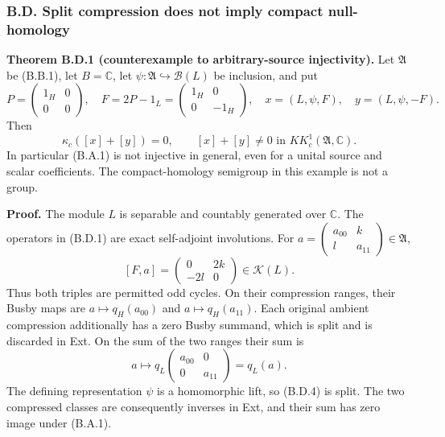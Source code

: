 \documentclass[
  11pt,
]{article}
\begin{document}
\subsubsection{B.D. Split compression does not imply compact
null-homology}\label{b.d.-split-compression-does-not-imply-compact-null-homology}

\textbf{Theorem B.D.1 (counterexample to arbitrary-source injectivity).}
Let \(\mathfrak A\) be (B.B.1), let \(B=\mathbb C\), let
\(\psi:\mathfrak A\hookrightarrow\mathcal B(L)\) be inclusion, and put
\[
P=\begin{pmatrix}1_H&0\\0&0\end{pmatrix},\quad
F=2P-1_L=\begin{pmatrix}1_H&0\\0&-1_H\end{pmatrix},\quad
x=(L,\psi,F),\quad y=(L,\psi,-F).
\tag{B.D.1}
\] Then \[
\kappa_c([x]+[y])=0,
\qquad [x]+[y]\ne0\text{ in }KK_c^1(\mathfrak A,\mathbb C).
\tag{B.D.2}
\] In particular (B.A.1) is not injective in general, even for a unital
source and scalar coefficients. The compact-homology semigroup in this
example is not a group.

\textbf{Proof.} The module \(L\) is separable and countably generated
over \(\mathbb C\). The operators in (B.D.1) are exact self-adjoint
involutions. For
\(a=\left(\begin{smallmatrix}a_{00}&k\\l&a_{11}\end{smallmatrix}\right)\in\mathfrak A\),
\[
[F,a]=\begin{pmatrix}0&2k\\-2l&0\end{pmatrix}\in\mathcal K(L).
\tag{B.D.3}
\] Thus both triples are permitted odd cycles. On their compression
ranges, their Busby maps are \(a\mapsto q_H(a_{00})\) and
\(a\mapsto q_H(a_{11})\). Each original ambient compression additionally
has a zero Busby summand, which is split and is discarded in Ext. On the
sum of the two ranges their sum is \[
a\longmapsto q_L\!\begin{pmatrix}a_{00}&0\\0&a_{11}\end{pmatrix}
=q_L(a).
\tag{B.D.4}
\] The defining representation \(\psi\) is a homomorphic lift, so
(B.D.4) is split. The two compressed classes are consequently inverses
in Ext, and their sum has zero image under (B.A.1).
\end{document}
